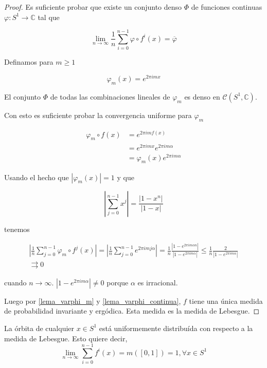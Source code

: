 \begin{proof}
	Es suficiente probar que existe un conjunto denso $\Phi$ de funciones continuas $\varphi: S^1 \rightarrow \mathbb{C}$ tal que
	
	\begin{equation}
		\lim_{n \rightarrow \infty} \frac{1}{n} \sum_{i=0}^{n-1} \varphi \circ f^i(x) = \overline{\varphi}
	\end{equation}
	
	Definamos para $m \geq 1$
	
	\begin{equation}
		\varphi_m(x) = e^{2\pi imx}
	\end{equation}
	
	El conjunto $\Phi$ de todas las combinaciones lineales de $\varphi_m$ es denso en $\mathcal{C}(S^1,\mathbb{C})$.
	
	Con esto es suficiente probar la convergencia uniforme para $\varphi_m$
	
	\begin{align}
		\varphi_m \circ f(x) &= e^{2\pi imf(x)}\\
		&= e^{2\pi imx} e^{2\pi im\alpha}\\
		&= \varphi_m(x) e^{2\pi im\alpha}
	\end{align}
	
	Usando el hecho que $|\varphi_m(x)|=1$ y que
	
	\begin{equation}
		\left| \sum_{j=0}^{n-1} x^j \right| = \frac{|1-x^n|}{|1-x|}
	\end{equation}
	
	tenemos
	
	\begin{multline}
		\left| \frac{1}{n} \sum_{j=0}^{n-1} \varphi_m \circ f^j(x) \right| = \left| \frac{1}{n} \sum_{j=0}^{n-1} e^{2\pi imj\alpha} \right| = \frac{1}{n} \frac{|1-e^{2\pi im\alpha n}|}{|1-e^{2\pi im\alpha}|} \leq \frac{1}{n} \frac{2}{|1-e^{2\pi im\alpha}|}\\
		\rightrightarrows 0
	\end{multline}
	
	cuando $n \rightarrow \infty$. $|1-e^{2\pi im\alpha}| \neq 0$ porque $\alpha$ es irracional.
	
	Luego por \ref{lema_varphi_m} y \ref{lema_varphi_continua}, $f$ tiene una única medida de probabilidad invariante y ergódica. Esta medida es la medida de Lebesgue.
\end{proof}

\begin{teorema}
  La órbita de cualquier $ x \in S^1 $ está uniformemente distribuída con respecto a la medida de Lebesgue. Esto quiere decir,
  \begin{equation}
    \lim_{n \rightarrow \infty} \sum_{i=0}^{n-1} f^i(x) = m([0,1])=1, \forall x \in S^1
  \end{equation}

\end{teorema}

